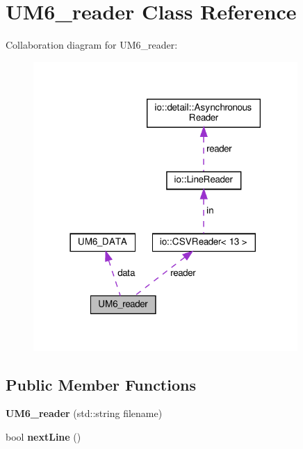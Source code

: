 \hypertarget{classUM6__reader}{}\section{U\+M6\+\_\+reader Class Reference}
\label{classUM6__reader}


Collaboration diagram for U\+M6\+\_\+reader\+:\nopagebreak
\begin{figure}[H]
\begin{center}
\leavevmode
\includegraphics[width=285pt]{classUM6__reader__coll__graph}
\end{center}
\end{figure}
\subsection*{Public Member Functions}
\begin{DoxyCompactItemize}
\item 
\mbox{\label{classUM6__reader_a4c1e7e60a4ad6c5387456df9f5642880}} 
{\bfseries U\+M6\+\_\+reader} (std\+::string filename)
\item 
\mbox{\label{classUM6__reader_a1886d8398f9590ed762a92603663272f}} 
bool {\bfseries next\+Line} ()
\end{DoxyCompactItemize}
